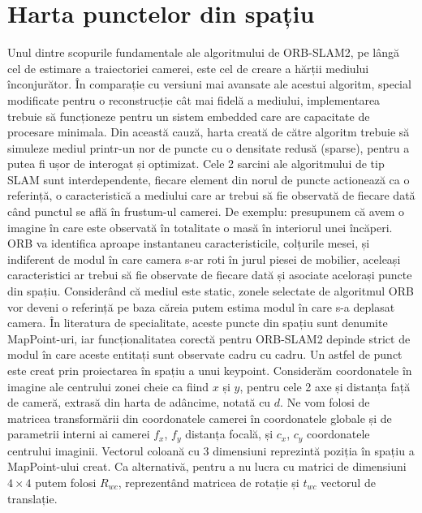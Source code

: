 \documentclass[12pt,a4paper]{report}
\begin{document}
\section{Harta punctelor din spațiu}
Unul dintre scopurile fundamentale ale algoritmului de ORB-SLAM2, pe lângă cel 
de estimare a traiectoriei camerei, este cel de creare a hărții mediului
înconjurător. În comparație cu versiuni mai avansate ale
acestui algoritm, special modificate pentru o reconstrucție cât mai fidelă a mediului,
implementarea trebuie să funcționeze pentru un sistem embedded care are  
capacitate de procesare minimala. Din această cauză, harta creată 
de către algoritm trebuie să simuleze mediul printr-un nor de puncte cu o
densitate redusă (sparse), pentru a putea fi ușor de interogat și optimizat. 
Cele 2 sarcini ale algoritmului de tip SLAM sunt interdependente, fiecare 
element din norul de puncte actionează ca o referință, o caracteristică a mediului care
ar trebui să fie observată de fiecare 
dată când punctul se află în frustum-ul camerei. De exemplu: presupunem că avem
o imagine în care este observată în totalitate o masă în interiorul unei încăperi. 
ORB va identifica aproape instantaneu caracteristicile, colțurile mesei, și
indiferent de modul în care camera s-ar roti în jurul piesei de mobilier, aceleași caracteristici
ar trebui să fie observate de fiecare dată și asociate acelorași puncte din spațiu. Considerând că mediul 
este static, zonele selectate de algoritmul ORB vor deveni o referință pe baza căreia putem estima modul 
în care s-a deplasat camera. În literatura de specialitate, aceste puncte din spațiu sunt denumite MapPoint-uri, 
iar funcționalitatea corectă pentru ORB-SLAM2 depinde strict de 
modul în care aceste entitați sunt observate cadru cu cadru. Un astfel de punct 
este creat prin proiectarea în spațiu a unui keypoint. Considerăm 
coordonatele în imagine ale centrului zonei cheie ca fiind  \(x\) și \(y\), pentru cele 
2 axe și distanța față de cameră, extrasă din harta de adâncime, notată cu \(d\). Ne vom 
folosi de matricea transformării din coordonatele camerei
în coordonatele globale și de parametrii interni ai camerei \(f_x\), \(f_y\) 
distanța focală, și \(c_x\), \(c_y\) coordonatele centrului imaginii.
Vectorul coloană cu 3 dimensiuni reprezintă poziția în spațiu a MapPoint-ului creat.
Ca alternativă, pentru a nu lucra cu matrici de dimensiuni $ 4 \times 4 $ putem folosi \(R_{wc}\), reprezentând
matricea de rotație și \(t_{wc}\) vectorul de translație.
\end{document}
